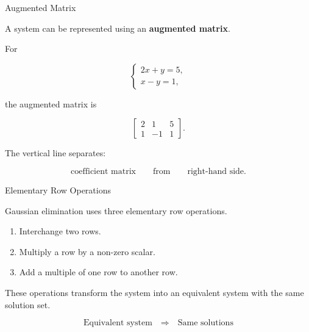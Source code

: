 
\begin{frame}{Augmented Matrix}

A system can be represented using an \textbf{augmented matrix}.

For

\[
\begin{cases}
2x+y=5,\\
x-y=1,
\end{cases}
\]

the augmented matrix is

\[
\boxed{
\left[
\begin{array}{cc|c}
2&1&5\\
1&-1&1
\end{array}
\right].
}
\]

\vspace{0.4cm}

The vertical line separates:

\[
\text{coefficient matrix}
\qquad\text{from}\qquad
\text{right-hand side}.
\]

\end{frame}



\begin{frame}{Elementary Row Operations}

Gaussian elimination uses three elementary row operations.

\vspace{0.4cm}

\begin{enumerate}
    \item Interchange two rows.
    \item Multiply a row by a non-zero scalar.
    \item Add a multiple of one row to another row.
\end{enumerate}

\vspace{0.5cm}

These operations transform the system into an equivalent
system with the same solution set.

\[
\boxed{
\text{Equivalent system}
\quad\Longrightarrow\quad
\text{Same solutions}
}
\]

\end{frame}


